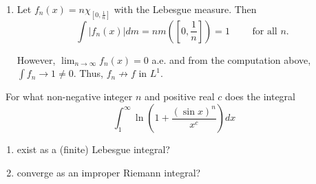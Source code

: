 \documentclass[12pt]{Qual}
\begin{document}
\begin{solution}
\begin{enumerate}[label=(\alph*)]
\begin{comment}
    Finally, since $\varepsilon$ was arbitrary, the above limit is zero and we are done.
\end{comment}
    \item Let $f_n(x)=n\chi_{[0,\frac{1}{n}]}$ with the Lebesgue measure. Then $$\int |f_n(x)|dm=nm\left(\left[0,\frac{1}{n}\right]\right)=1\qquad\text{ for all }n.$$

    However, $\displaystyle\lim_{n\to\infty}f_n(x)=0$ a.e. and from the computation above, $\int f_n\to1\not=0$. Thus, $f_n\not\to f$ in $L^1$.
\end{enumerate}
\end{solution}
\newpage

\begin{problem} $\,$
For what non-negative integer $n$ and positive real $c$ does the integral $$\int_1^\infty\ln\left(1+\frac{(\sin x)^n}{x^c}\right)dx$$
\begin{enumerate}[label=(\alph*)]
    \item exist as a (finite) Lebesgue integral?
    \item converge as an improper Riemann integral?
\end{enumerate}
\end{problem}
\end{document}
